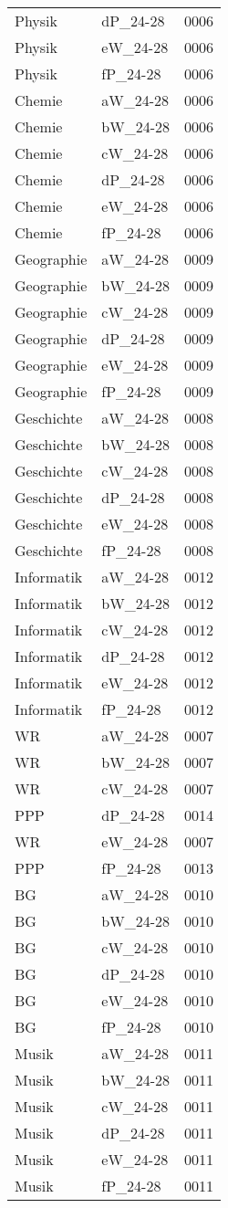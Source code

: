 \documentclass{standalone}
\begin{document}
\begin{tabular}{|l|l|l|}
    Physik&dP\_24-28&0006\\
    Physik&eW\_24-28&0006\\
    Physik&fP\_24-28&0006\\
    Chemie&aW\_24-28&0006\\
    Chemie&bW\_24-28&0006\\
    Chemie&cW\_24-28&0006\\
    Chemie&dP\_24-28&0006\\
    Chemie&eW\_24-28&0006\\
    Chemie&fP\_24-28&0006\\
    Geographie&aW\_24-28&0009\\
    Geographie&bW\_24-28&0009\\
    Geographie&cW\_24-28&0009\\
    Geographie&dP\_24-28&0009\\
    Geographie&eW\_24-28&0009\\
    Geographie&fP\_24-28&0009\\
    Geschichte&aW\_24-28&0008\\
    Geschichte&bW\_24-28&0008\\
    Geschichte&cW\_24-28&0008\\
    Geschichte&dP\_24-28&0008\\
    Geschichte&eW\_24-28&0008\\
    Geschichte&fP\_24-28&0008\\
    Informatik&aW\_24-28&0012\\
    Informatik&bW\_24-28&0012\\
    Informatik&cW\_24-28&0012\\
    Informatik&dP\_24-28&0012\\
    Informatik&eW\_24-28&0012\\
    Informatik&fP\_24-28&0012\\
    WR&aW\_24-28&0007\\
    WR&bW\_24-28&0007\\
    WR&cW\_24-28&0007\\
    PPP&dP\_24-28&0014\\
    WR&eW\_24-28&0007\\
    PPP&fP\_24-28&0013\\
    BG&aW\_24-28&0010\\
    BG&bW\_24-28&0010\\
    BG&cW\_24-28&0010\\
    BG&dP\_24-28&0010\\
    BG&eW\_24-28&0010\\
    BG&fP\_24-28&0010\\
    Musik&aW\_24-28&0011\\
    Musik&bW\_24-28&0011\\
    Musik&cW\_24-28&0011\\
    Musik&dP\_24-28&0011\\
    Musik&eW\_24-28&0011\\
    Musik&fP\_24-28&0011\\
    \hline
    \end{tabular}
\end{document}
